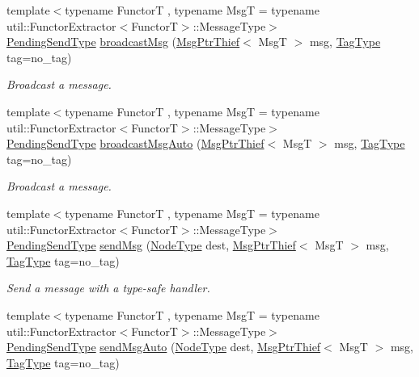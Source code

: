 \begin{DoxyCompactItemize}
{\footnotesize template$<$typename FunctorT , typename MsgT  = typename util\+::\+Functor\+Extractor$<$\+Functor\+T$>$\+::\+Message\+Type$>$ }\\\hyperlink{structvt_1_1messaging_1_1_active_messenger_a3626a6ca76d8ad4ec7c3b47a2c70d3a8}{Pending\+Send\+Type} \hyperlink{group__functorsend_ga06f3b2d69156852600ead958ae95e3c9}{broadcast\+Msg} (\hyperlink{structvt_1_1messaging_1_1_msg_ptr_thief}{Msg\+Ptr\+Thief}$<$ MsgT $>$ msg, \hyperlink{namespacevt_a84ab281dae04a52a4b243d6bf62d0e52}{Tag\+Type} tag=no\+\_\+tag)
\begin{DoxyCompactList}\small\item\em Broadcast a message. \end{DoxyCompactList}\item 
{\footnotesize template$<$typename FunctorT , typename MsgT  = typename util\+::\+Functor\+Extractor$<$\+Functor\+T$>$\+::\+Message\+Type$>$ }\\\hyperlink{structvt_1_1messaging_1_1_active_messenger_a3626a6ca76d8ad4ec7c3b47a2c70d3a8}{Pending\+Send\+Type} \hyperlink{group__functorsend_ga9337b80d48503a52676f80f86bc66cf2}{broadcast\+Msg\+Auto} (\hyperlink{structvt_1_1messaging_1_1_msg_ptr_thief}{Msg\+Ptr\+Thief}$<$ MsgT $>$ msg, \hyperlink{namespacevt_a84ab281dae04a52a4b243d6bf62d0e52}{Tag\+Type} tag=no\+\_\+tag)
\begin{DoxyCompactList}\small\item\em Broadcast a message. \end{DoxyCompactList}\item 
{\footnotesize template$<$typename FunctorT , typename MsgT  = typename util\+::\+Functor\+Extractor$<$\+Functor\+T$>$\+::\+Message\+Type$>$ }\\\hyperlink{structvt_1_1messaging_1_1_active_messenger_a3626a6ca76d8ad4ec7c3b47a2c70d3a8}{Pending\+Send\+Type} \hyperlink{group__functorsend_gaab0dc380a72f038f4fc2350ba89de98f}{send\+Msg} (\hyperlink{namespacevt_a866da9d0efc19c0a1ce79e9e492f47e2}{Node\+Type} dest, \hyperlink{structvt_1_1messaging_1_1_msg_ptr_thief}{Msg\+Ptr\+Thief}$<$ MsgT $>$ msg, \hyperlink{namespacevt_a84ab281dae04a52a4b243d6bf62d0e52}{Tag\+Type} tag=no\+\_\+tag)
\begin{DoxyCompactList}\small\item\em Send a message with a type-\/safe handler. \end{DoxyCompactList}\item 
{\footnotesize template$<$typename FunctorT , typename MsgT  = typename util\+::\+Functor\+Extractor$<$\+Functor\+T$>$\+::\+Message\+Type$>$ }\\\hyperlink{structvt_1_1messaging_1_1_active_messenger_a3626a6ca76d8ad4ec7c3b47a2c70d3a8}{Pending\+Send\+Type} \hyperlink{group__functorsend_ga902007cdc61f7c93e694b7c4c89d7ee1}{send\+Msg\+Auto} (\hyperlink{namespacevt_a866da9d0efc19c0a1ce79e9e492f47e2}{Node\+Type} dest, \hyperlink{structvt_1_1messaging_1_1_msg_ptr_thief}{Msg\+Ptr\+Thief}$<$ MsgT $>$ msg, \hyperlink{namespacevt_a84ab281dae04a52a4b243d6bf62d0e52}{Tag\+Type} tag=no\+\_\+tag)

\end{DoxyCompactItemize}
